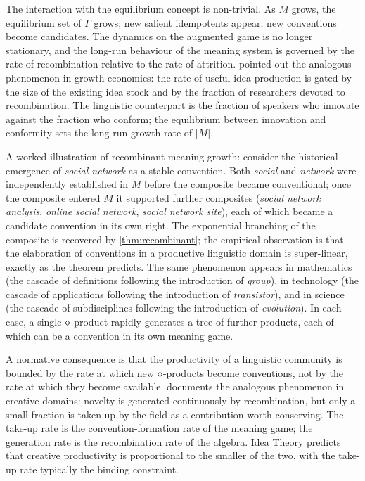 The interaction with the equilibrium concept is non-trivial. As $M$
grows, the equilibrium set of $\Gamma$ grows; new salient idempotents
appear; new conventions become candidates. The dynamics on the
augmented game is no longer stationary, and the long-run behaviour of
the meaning system is governed by the rate of recombination relative
to the rate of attrition. \cite{Jones1995} pointed out the analogous
phenomenon in growth economics: the rate of useful idea production is
gated by the size of the existing idea stock and by the fraction of
researchers devoted to recombination. The linguistic counterpart is the
fraction of speakers who innovate against the fraction who conform;
the equilibrium between innovation and conformity sets the long-run
growth rate of $|M|$.

A worked illustration of recombinant meaning growth: consider the
historical emergence of \emph{social network} as a stable convention.
Both \emph{social} and \emph{network} were independently established
in $M$ before the composite became conventional; once the composite
entered $M$ it supported further composites (\emph{social network
analysis}, \emph{online social network}, \emph{social network site}),
each of which became a candidate convention in its own right. The
exponential branching of the composite is recovered by
\cref{thm:recombinant}; the empirical observation is that the
elaboration of conventions in a productive linguistic domain is
super-linear, exactly as the theorem predicts. The same phenomenon
appears in mathematics (the cascade of definitions following the
introduction of \emph{group}), in technology (the cascade of
applications following the introduction of \emph{transistor}), and in
science (the cascade of subdisciplines following the introduction of
\emph{evolution}). In each case, a single $\mathbin{\diamond}$-product rapidly
generates a tree of further products, each of which can be a
convention in its own meaning game.

A normative consequence is that the productivity of a linguistic
community is bounded by the rate at which new $\mathbin{\diamond}$-products
become conventions, not by the rate at which they become available.
\cite{Csikszentmihalyi1996} documents the analogous phenomenon in
creative domains: novelty is generated continuously by recombination,
but only a small fraction is taken up by the field as a contribution
worth conserving. The take-up rate is the convention-formation rate of
the meaning game; the generation rate is the recombination rate of the
algebra. Idea Theory predicts that creative productivity is
proportional to the smaller of the two, with the take-up rate
typically the binding constraint.

